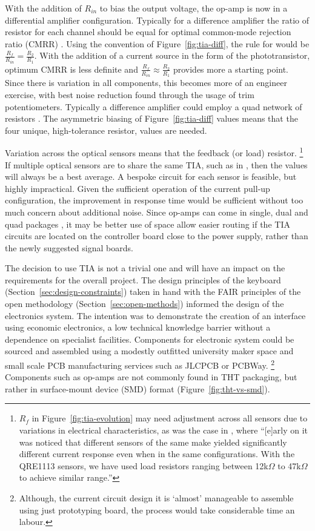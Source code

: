 With the addition of $R_{in}$ to bias the output voltage, the op-amp is now in a
differential amplifier configuration. Typically for a difference amplifier the
ratio of resistor for each channel should be equal for optimal common-mode
rejection ratio (CMRR) \cite{olson_optimizing_2023}. Using the convention of
Figure~\ref{fig:tia-diff}, the rule for would be $\frac{R_f}{R_{in}} =
    \frac{R_2}{R_1}$. With the addition of a current source in the form of the
phototransistor, optimum CMRR is less definite and $\frac{R_f}{R_{in}} \approx
    \frac{R_2}{R_1}$ provides more a starting point. 
Since there is variation in all components, this becomes more of an
engineer exercise, with best noise reduction found through the usage of trim potentiometers.
Typically a difference amplifier could employ a quad network of resistors
\cite[p.~227]{horowitz_art_2015}. The asymmetric biasing of
Figure~\ref{fig:tia-diff} values means that the four unique, high-tolerance
resistor, values are needed.

Variation across the optical sensors means that the feedback (or load) resistor.%
\footnote{$R_f$ in Figure~\ref{fig:tia-evolution} may need adjustment across all sensors due to variations in electrical characteristics, as was the
case in \textcite{pardue_near_2013}, where ``[e]arly on it was noticed that different sensors of the same make yielded significantly different current response even when in the same configurations. With the QRE1113 sensors, we have used load resistors ranging between 12k$\Omega$ to 47k$\Omega$ to achieve similar range.''}
If multiple optical sensors are to share the same TIA, such as in
\textcite{mcpherson_portable_2013}, then the values will always be a best
average. A bespoke circuit for each sensor is feasible, but highly impractical.
Given the sufficient operation of the current pull-up configuration, the
improvement in response time would be sufficient without too much concern about
additional noise. Since op-amps can come in single, dual and quad packages
\cite{ti_opa4377_2011}, it may be better use of space allow easier routing if
the TIA circuits are located on the controller board close to the power supply,
rather than the newly suggested signal boards.

The decision to use TIA is not a trivial one and will have an impact on the
requirements for the overall project. The design principles of the keyboard
(Section~\ref{sec:design-constraints}) taken in hand with the FAIR principles of
the open methodology (Section~\ref{sec:open-methods}) informed the design of the
electronics system. The intention was to demonstrate the creation of an
interface using economic electronics, a low technical knowledge barrier without
a dependence on specialist facilities. Components for electronic system could be
sourced and assembled using a modestly outfitted university maker space and
small scale PCB manufacturing services such as JLCPCB or PCBWay.%
\footnote{Although, the current circuit design it is `almost' manageable to assemble using just
prototyping board, the process would take considerable time an labour.} Components such as
op-amps are not commonly found in THT packaging, but rather in surface-mount
device (SMD) format (Figure~\ref{fig:tht-vs-smd}).

